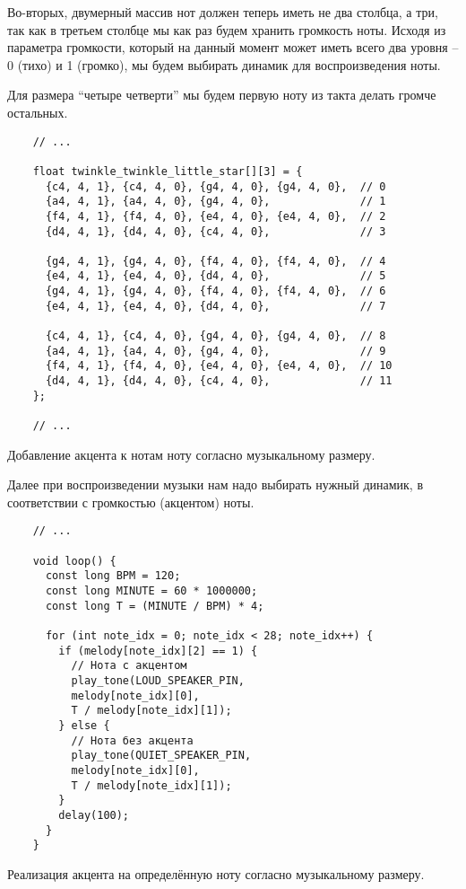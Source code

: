 \documentclass[../sparc.tex]{subfiles}
\begin{document}
Во-вторых, двумерный массив нот должен теперь иметь не два столбца, а три, так
как в третьем столбце мы как раз будем хранить громкость ноты.  Исходя из
параметра громкости, который на данный момент может иметь всего два уровня -- 0
(тихо) и 1 (громко), мы будем выбирать динамик для воспроизведения ноты.

Для размера ``четыре четверти'' мы будем первую ноту из такта делать громче
остальных.

\begin{listing}[!h]
  \begin{verbatim}
    // ...

    float twinkle_twinkle_little_star[][3] = {
      {c4, 4, 1}, {c4, 4, 0}, {g4, 4, 0}, {g4, 4, 0},  // 0
      {a4, 4, 1}, {a4, 4, 0}, {g4, 4, 0},              // 1
      {f4, 4, 1}, {f4, 4, 0}, {e4, 4, 0}, {e4, 4, 0},  // 2
      {d4, 4, 1}, {d4, 4, 0}, {c4, 4, 0},              // 3

      {g4, 4, 1}, {g4, 4, 0}, {f4, 4, 0}, {f4, 4, 0},  // 4
      {e4, 4, 1}, {e4, 4, 0}, {d4, 4, 0},              // 5
      {g4, 4, 1}, {g4, 4, 0}, {f4, 4, 0}, {f4, 4, 0},  // 6
      {e4, 4, 1}, {e4, 4, 0}, {d4, 4, 0},              // 7

      {c4, 4, 1}, {c4, 4, 0}, {g4, 4, 0}, {g4, 4, 0},  // 8
      {a4, 4, 1}, {a4, 4, 0}, {g4, 4, 0},              // 9
      {f4, 4, 1}, {f4, 4, 0}, {e4, 4, 0}, {e4, 4, 0},  // 10
      {d4, 4, 1}, {d4, 4, 0}, {c4, 4, 0},              // 11
    };

    // ...
  \end{verbatim}
  \label{listing:adding-musical-scale-to-array}
  \caption{Добавление акцента к нотам ноту согласно музыкальному
    размеру.}
\end{listing}

Далее при воспроизведении музыки нам надо выбирать нужный динамик, в
соответствии с громкостью (акцентом) ноты.

\begin{listing}[h]
  \begin{verbatim}
    // ...

    void loop() {
      const long BPM = 120;
      const long MINUTE = 60 * 1000000;
      const long T = (MINUTE / BPM) * 4;

      for (int note_idx = 0; note_idx < 28; note_idx++) {
        if (melody[note_idx][2] == 1) {
          // Нота с акцентом
          play_tone(LOUD_SPEAKER_PIN,
          melody[note_idx][0],
          T / melody[note_idx][1]);
        } else {
          // Нота без акцента
          play_tone(QUIET_SPEAKER_PIN,
          melody[note_idx][0],
          T / melody[note_idx][1]);
        }
        delay(100);
      }
    }
  \end{verbatim}
  \label{listing:musical-scale-implementation}
  \caption{Реализация акцента на определённую ноту согласно музыкальному
    размеру.}
\end{listing}
\end{document}
